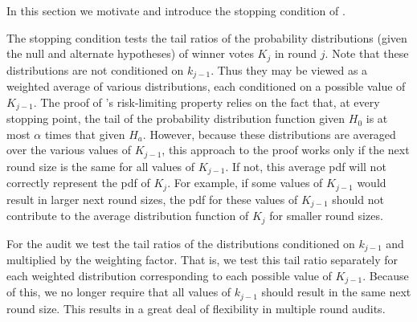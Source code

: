 In this section we motivate and introduce the stopping condition of \Providence.

The \Minerva stopping condition tests the tail ratios of the probability distributions (given the null and alternate hypotheses) of winner votes $K_j$ in round $j$. Note that these distributions are not conditioned on $k_{j-1}$. Thus they may be viewed as a weighted average of various distributions, each conditioned on a possible value of $K_{j-1}$. The proof of \Minerva's risk-limiting property relies on the fact that, at every stopping point, the tail of the probability distribution function given $H_0$ is at most $\alpha$ times that given $H_a$. However, because these distributions are averaged over the various values of $K_{j-1}$, this approach to the proof works only if the next round size is the same for all values of $K_{j-1}$. If not, this average pdf will not correctly represent the pdf of $K_j$. For example, if some values of $K_{j-1}$ would result in larger next round sizes, the pdf for these values of $K_{j-1}$ should not contribute to the average distribution function of $K_j$ for smaller round sizes. 

For the \Providence audit we test the tail ratios of the distributions conditioned on $k_{j-1}$ and multiplied by the weighting factor. That is, we test this tail ratio separately for each weighted distribution corresponding to each possible value of $K_{j-1}$. Because of this, we no longer require that all values of $k_{j-1}$ should result in the same next round size. This results in a great deal of flexibility in multiple round audits. 

